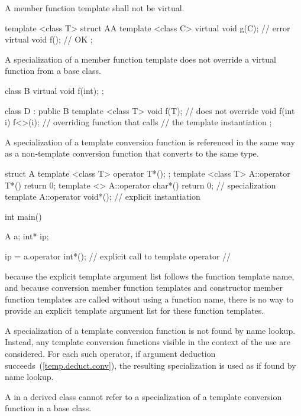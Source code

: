 \pnum
A member function template shall not be virtual.
\enterexample

\begin{codeblock}
template <class T> struct AA {
	template <class C> virtual void g(C);   // error
	virtual void f();                       // OK
};
\end{codeblock}
\exitexampleb

\pnum
A specialization of
a member function template does not override a virtual function from a
base class.
\enterexample

\begin{codeblock}
class B {
	virtual void f(int);
};

class D : public B {
	template <class T> void f(T);	// does not override 
	void f(int i) { f<>(i); }	// overriding function that calls
					// the template instantiation
};
\end{codeblock}
\exitexampleb

\pnum
A specialization of a template conversion function is referenced in
the same way as a non-template conversion function that converts to
the same type.
\enterexample

\begin{codeblock}
struct A {
	template <class T> operator T*();
};
template <class T> A::operator T*(){ return 0; }
template <> A::operator char*(){ return 0; }    // specialization
template A::operator void*();                   // explicit instantiation

int main()
{
	A      a;
	int*   ip;

	ip = a.operator int*();		// explicit call to template operator
					// 
}
\end{codeblock}
\exitexampleb
\enternote
because the explicit template argument list follows the function template
name, and because conversion member function templates and constructor
member function templates are called without using a function name,
there is no way to provide an explicit template argument list for these
function templates.
\exitnote

\pnum
A specialization of a template conversion function is not found by name
lookup. Instead, any template conversion functions visible in the
context of the use are considered. For each such operator, if argument
deduction succeeds~(\ref{temp.deduct.conv}), the resulting specialization is
used as if found by name lookup.

\pnum
A  in a derived class cannot refer to a specialization
of a template conversion function in a base class.

